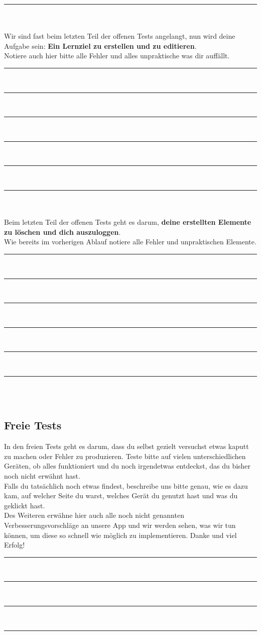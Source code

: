 \noindent\rule{\textwidth}{0.4pt}\\\\
Wir sind fast beim letzten Teil der offenen Tests angelangt, nun wird deine Aufgabe sein: \textbf{Ein Lernziel zu erstellen und zu editieren}.\\
Notiere auch hier bitte alle Fehler und alles unpraktische was dir auffällt.\\
\noindent\rule{\textwidth}{0.4pt}\\
\noindent\rule{\textwidth}{0.4pt}\\
\noindent\rule{\textwidth}{0.4pt}\\
\noindent\rule{\textwidth}{0.4pt}\\
\noindent\rule{\textwidth}{0.4pt}\\
\noindent\rule{\textwidth}{0.4pt}\\\\
Beim letzten Teil der offenen Tests geht es darum, \textbf{deine erstellten Elemente zu löschen und dich auszuloggen}.\\
Wie bereits im vorherigen Ablauf notiere alle Fehler und unpraktischen Elemente.\\
\noindent\rule{\textwidth}{0.4pt}\\
\noindent\rule{\textwidth}{0.4pt}\\
\noindent\rule{\textwidth}{0.4pt}\\
\noindent\rule{\textwidth}{0.4pt}\\
\noindent\rule{\textwidth}{0.4pt}\\
\noindent\rule{\textwidth}{0.4pt}\\\\
\subsection{Freie Tests}
In den freien Tests geht es darum, dass du selbst gezielt versuchst etwas kaputt zu machen oder Fehler zu produzieren. Teste bitte auf vielen unterschiedlichen Geräten, ob alles funktioniert und du noch irgendetwas entdeckst, das du bisher noch nicht erwähnt hast. \\
Falls du tatsächlich noch etwas findest, beschreibe uns bitte genau, wie es dazu kam, auf welcher Seite du warst, welches Gerät du genutzt hast und was du geklickt hast.\\
Des Weiteren erwähne hier auch alle noch nicht genannten Verbesserungsvorschläge an unsere App und wir werden sehen, was wir tun können, um diese so schnell wie möglich zu implementieren. Danke und viel Erfolg!\\
\noindent\rule{\textwidth}{0.4pt}\\ %
\noindent\rule{\textwidth}{0.4pt}\\
\noindent\rule{\textwidth}{0.4pt}\\
\noindent\rule{\textwidth}{0.4pt}\\
